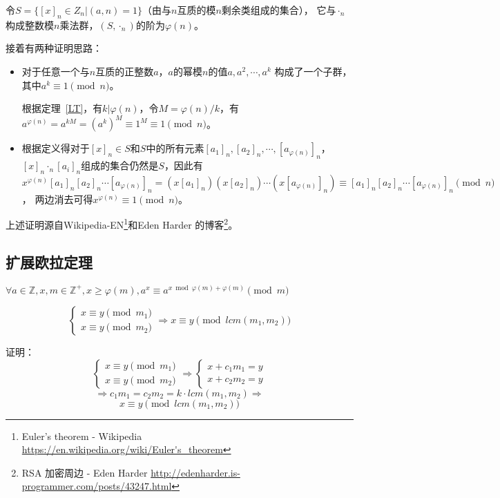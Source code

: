 令$S=\{[x]_n\in Z_n|(a,n)=1\}$（由与$n$互质的模$n$剩余类组成的集合），
它与$\cdot_n$构成整数模$n$乘法群，$(S,\cdot_n)$的阶为$\varphi(n)$。

接着有两种证明思路：
\begin{itemize}
	\item 对于任意一个与$n$互质的正整数$a$，$a$的幂模$n$的值$a,a^2,\cdots,a^k$
	      构成了一个子群，其中$a^k\equiv 1 \pmod{n}$。

	      根据定理~\ref{LT}，有$k|\varphi(n)$，令$M=\varphi(n)/k$，有
	      $a^{\varphi(n)}=a^{kM}=(a^k)^M\equiv 1^M\equiv 1 \pmod{n}$。
	\item 根据定义得对于$[x]_n\in S$和$S$中的所有元素$[a_1]_n,[a_2]_n,\cdots,
		      [a_{\varphi(n)}]_n$，$[x]_n \cdot_n [a_i]_n$组成的集合仍然是$S$，因此有$x^{\varphi(n)}
			      [a_1]_n[a_2]_n\cdots[a_{\varphi(n)}]_n= (x[a_1]_n)(x[a_2]_n)\cdots
		      (x[a_{\varphi(n)}]_n)\equiv[a_1]_n[a_2]_n\cdots[a_{\varphi(n)}]_n\pmod{n}$，
	      两边消去可得$x^{\varphi(n)}\equiv 1\pmod{n}$。
\end{itemize}

上述证明源自Wikipedia-EN\footnote{Euler's theorem - Wikipedia
	\url{https://en.wikipedia.org/wiki/Euler's\_theorem}}和Eden Harder
的博客\footnote{RSA 加密周边 - Eden Harder
	\url{http://edenharder.is-programmer.com/posts/43247.html}}。
\subsection{扩展欧拉定理}
\begin{theorem}\label{exEuler}
	$\forall a\in \mathbb{Z},x,m\in \mathbb{Z^+},x\geq \varphi(m)
		,a^x\equiv a^{x \bmod \varphi(m)+\varphi(m)} \pmod{m}$
\end{theorem}

\begin{lemma}\label{EEL1}
	\begin{displaymath}
		\left\{
		\begin{array}{l}
			x\equiv y \pmod{m_1} \\
			x\equiv y \pmod{m_2}
		\end{array}
		\right.
		\Rightarrow x\equiv y \pmod{lcm(m_1,m_2)}
	\end{displaymath}
\end{lemma}

证明：
\begin{displaymath}
	\left\{
	\begin{array}{l}
		x\equiv y \pmod{m_1} \\
		x\equiv y \pmod{m_2}
	\end{array}
	\right.
	\Rightarrow
	\left\{
	\begin{array}{l}
		x+c_1m_1=y \\
		x+c_2m_2=y
	\end{array}
	\right.
\end{displaymath}
\begin{displaymath}
	\Rightarrow
	c_1m_1=c_2m_2=k\cdot lcm(m_1,m_2)
	\Rightarrow
\end{displaymath}
\begin{displaymath}
	x \equiv y \pmod{lcm(m_1,m_2)}
\end{displaymath}

